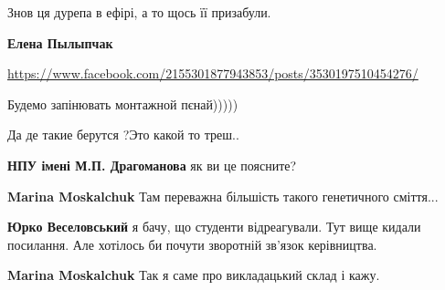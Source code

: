 \begin{itemize}
Знов ця дурепа в ефірі, а то щось її призабули.

\begin{itemize}

\textbf{Елена Пылыпчак} 

\url{https://www.facebook.com/2155301877943853/posts/3530197510454276/}
\end{itemize}


Будемо запінювать монтажной пєнай)))))


Да де такие берутся ?Это какой то треш..


\textbf{НПУ імені М.П. Драгоманова} як ви це поясните?

\begin{itemize}

\textbf{Marina Moskalchuk} Там переважна більшість такого генетичного сміття...


\textbf{Юрко Веселовський} я бачу, що студенти відреагували. Тут вище кидали посилання.
Але хотілось би почути зворотній зв'язок керівництва.


\textbf{Marina Moskalchuk} Так я саме про викладацький склад і кажу.



\end{itemize}
\end{itemize}

